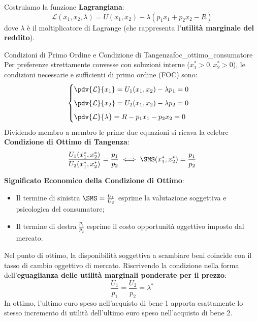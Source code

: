 Costruiamo la funzione \textbf{Lagrangiana}:
\begin{equation}
    \mathcal{L}(x_1, x_2, \lambda) = U(x_1, x_2) - \lambda (p_1 x_1 + p_2 x_2 - R)
\end{equation}
dove $\lambda$ è il moltiplicatore di Lagrange (che rappresenta l'\textbf{utilità marginale del reddito}).

\begin{teorema}{Condizioni di Primo Ordine e Condizione di Tangenza}{foc_ottimo_consumatore}
Per preferenze strettamente convesse con soluzioni interne ($x_1^* > 0, x_2^* > 0$), le condizioni necessarie e sufficienti di primo ordine (FOC) sono:
\begin{equation}
    \begin{cases}
        \pdv{\mathcal{L}}{x_1} = U_1(x_1, x_2) - \lambda p_1 = 0 \\[0.5em]
        \pdv{\mathcal{L}}{x_2} = U_2(x_1, x_2) - \lambda p_2 = 0 \\[0.5em]
        \pdv{\mathcal{L}}{\lambda} = R - p_1 x_1 - p_2 x_2 = 0
    \end{cases}
\end{equation}
Dividendo membro a membro le prime due equazioni si ricava la celebre \textbf{Condizione di Ottimo di Tangenza}:
\begin{equation}
    \frac{U_1(x_1^*, x_2^*)}{U_2(x_1^*, x_2^*)} = \frac{p_1}{p_2} \iff \SMS(x_1^*, x_2^*) = \frac{p_1}{p_2}
\end{equation}
\end{teorema}

\textbf{Significato Economico della Condizione di Ottimo}:
\begin{itemize}
    \item Il termine di sinistra $\SMS = \frac{U_1}{U_2}$ esprime la valutazione soggettiva e psicologica del consumatore;
    \item Il termine di destra $\frac{p_1}{p_2}$ esprime il costo opportunità oggettivo imposto dal mercato.
\end{itemize}
Nel punto di ottimo, la disponibilità soggettiva a scambiare beni coincide con il tasso di cambio oggettivo di mercato. Riscrivendo la condizione nella forma dell'\textbf{eguaglianza delle utilità marginali ponderate per il prezzo}:
\begin{equation}
    \frac{U_1}{p_1} = \frac{U_2}{p_2} = \lambda^*
\end{equation}
In ottimo, l'ultimo euro speso nell'acquisto di bene 1 apporta esattamente lo stesso incremento di utilità dell'ultimo euro speso nell'acquisto di bene 2.


